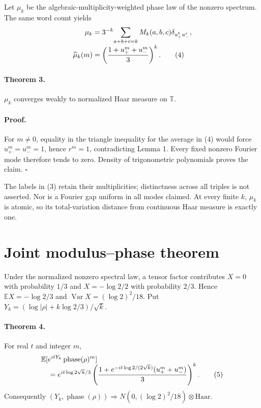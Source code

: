 \documentclass[10pt]{article}
\begin{document}
Let $\mu_k$ be the algebraic-multiplicity-weighted phase law of the nonzero
spectrum.  The same word count yields
\begin{align}
 \mu_k&=3^{-k}\!\sum_{a+b+c=k}M_k(a,b,c)
        \delta_{u_+^bu_-^c},\notag\\[-1mm]
 \widehat\mu_k(m)&=\left(\frac{1+u_+^m+u_-^m}{3}\right)^k.
                                                                    \tag{4}
\end{align}

\paragraph{Theorem 3.}
$\mu_k$ converges weakly to normalized Haar measure on $\mathbb T$.

\paragraph{Proof.}
For $m\ne0$, equality in the triangle inequality for the average in (4)
would force $u_+^m=u_-^m=1$, hence $r^m=1$, contradicting Lemma 1.  Every
fixed nonzero Fourier mode therefore tends to zero.  Density of
trigonometric polynomials proves the claim. \hfill$\square$

The labels in (3) retain their multiplicities; distinctness across all
triples is not asserted.  Nor is a Fourier gap uniform in all modes claimed.
At every finite $k$, $\mu_k$ is atomic, so its total-variation distance from
continuous Haar measure is exactly one.

\section{Joint modulus--phase theorem}
Under the normalized nonzero spectral law, a tensor factor contributes
$X=0$ with probability $1/3$ and $X=-\log2/2$ with probability $2/3$.
Hence $\mathbb EX=-\log2/3$ and
$\operatorname{Var}X=(\log2)^2/18$.  Put
$Y_k=(\log|\rho|+k\log2/3)/\sqrt{k}$.

\paragraph{Theorem 4.}
For real $t$ and integer $m$,
\begin{align}
 &\mathbb E[e^{itY_k}\operatorname{phase}(\rho)^m]\notag\\[-2mm]
 &\quad=e^{it\log2\sqrt{k}/3}
 \left(\frac{1+e^{-it\log2/(2\sqrt{k})}(u_+^m+u_-^m)}3\right)^k. \tag{5}
\end{align}
Consequently
$(Y_k,\operatorname{phase}(\rho))\Rightarrow
N(0,(\log2)^2/18)\otimes\mathrm{Haar}$.
\end{document}
